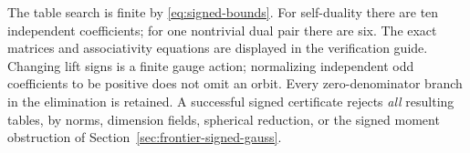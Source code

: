 The table search is finite by \eqref{eq:signed-bounds}. For self-duality
there are ten independent coefficients; for one nontrivial dual pair
there are six. The exact matrices and associativity equations are displayed
in the verification guide. Changing lift signs is a finite gauge action;
normalizing independent odd coefficients to be positive does not omit an
orbit. Every zero-denominator branch in the elimination is retained.
A successful signed certificate rejects \emph{all} resulting tables, by
norms, dimension fields, spherical reduction, or the signed moment
obstruction of Section~\ref{sec:frontier-signed-gauss}.
